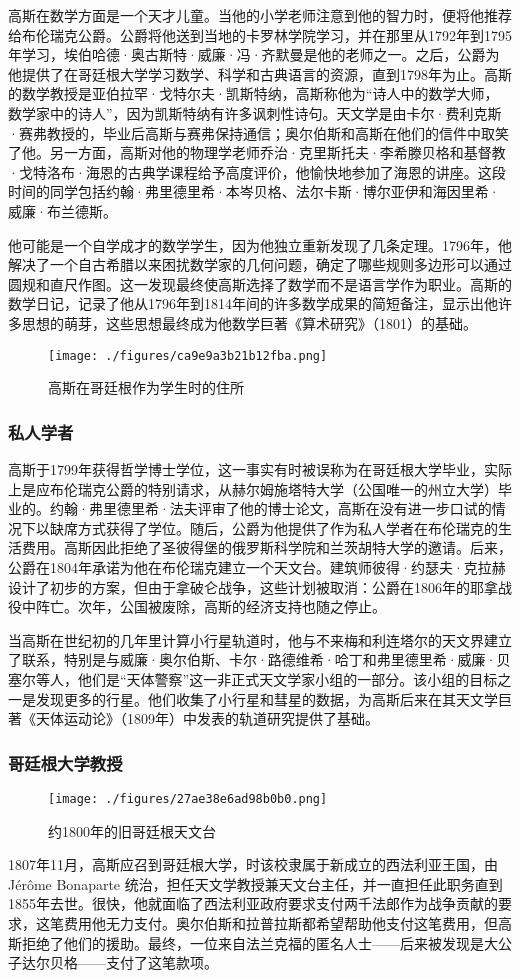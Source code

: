 高斯在数学方面是一个天才儿童。当他的小学老师注意到他的智力时，便将他推荐给布伦瑞克公爵。公爵将他送到当地的卡罗林学院学习，并在那里从1792年到1795年学习，埃伯哈德·奥古斯特·威廉·冯·齐默曼是他的老师之一。之后，公爵为他提供了在哥廷根大学学习数学、科学和古典语言的资源，直到1798年为止。高斯的数学教授是亚伯拉罕·戈特尔夫·凯斯特纳，高斯称他为“诗人中的数学大师，数学家中的诗人”，因为凯斯特纳有许多讽刺性诗句。天文学是由卡尔·费利克斯·赛弗教授的，毕业后高斯与赛弗保持通信；奥尔伯斯和高斯在他们的信件中取笑了他。另一方面，高斯对他的物理学老师乔治·克里斯托夫·李希滕贝格和基督教·戈特洛布·海恩的古典学课程给予高度评价，他愉快地参加了海恩的讲座。这段时间的同学包括约翰·弗里德里希·本岑贝格、法尔卡斯·博尔亚伊和海因里希·威廉·布兰德斯。

他可能是一个自学成才的数学学生，因为他独立重新发现了几条定理。1796年，他解决了一个自古希腊以来困扰数学家的几何问题，确定了哪些规则多边形可以通过圆规和直尺作图。这一发现最终使高斯选择了数学而不是语言学作为职业。高斯的数学日记，记录了他从1796年到1814年间的许多数学成果的简短备注，显示出他许多思想的萌芽，这些思想最终成为他数学巨著《算术研究》（1801）的基础。
\begin{figure}[ht]
\centering
\texttt{[image: ./figures/ca9e9a3b21b12fba.png]}
\caption{高斯在哥廷根作为学生时的住所} \label{fig_KRGS_2}
\end{figure}
\subsubsection{私人学者}  
高斯于1799年获得哲学博士学位，这一事实有时被误称为在哥廷根大学毕业，实际上是应布伦瑞克公爵的特别请求，从赫尔姆施塔特大学（公国唯一的州立大学）毕业的。约翰·弗里德里希·法夫评审了他的博士论文，高斯在没有进一步口试的情况下以缺席方式获得了学位。随后，公爵为他提供了作为私人学者在布伦瑞克的生活费用。高斯因此拒绝了圣彼得堡的俄罗斯科学院和兰茨胡特大学的邀请。后来，公爵在1804年承诺为他在布伦瑞克建立一个天文台。建筑师彼得·约瑟夫·克拉赫设计了初步的方案，但由于拿破仑战争，这些计划被取消：公爵在1806年的耶拿战役中阵亡。次年，公国被废除，高斯的经济支持也随之停止。

当高斯在世纪初的几年里计算小行星轨道时，他与不来梅和利连塔尔的天文界建立了联系，特别是与威廉·奥尔伯斯、卡尔·路德维希·哈丁和弗里德里希·威廉·贝塞尔等人，他们是“天体警察”这一非正式天文学家小组的一部分。该小组的目标之一是发现更多的行星。他们收集了小行星和彗星的数据，为高斯后来在其天文学巨著《天体运动论》（1809年）中发表的轨道研究提供了基础。
\subsubsection{哥廷根大学教授}
\begin{figure}[ht]
\centering
\texttt{[image: ./figures/27ae38e6ad98b0b0.png]}
\caption{约1800年的旧哥廷根天文台} \label{fig_KRGS_4}
\end{figure}
1807年11月，高斯应召到哥廷根大学，时该校隶属于新成立的西法利亚王国，由 Jérôme Bonaparte 统治，担任天文学教授兼天文台主任，并一直担任此职务直到1855年去世。很快，他就面临了西法利亚政府要求支付两千法郎作为战争贡献的要求，这笔费用他无力支付。奥尔伯斯和拉普拉斯都希望帮助他支付这笔费用，但高斯拒绝了他们的援助。最终，一位来自法兰克福的匿名人士——后来被发现是大公子达尔贝格——支付了这笔款项。

